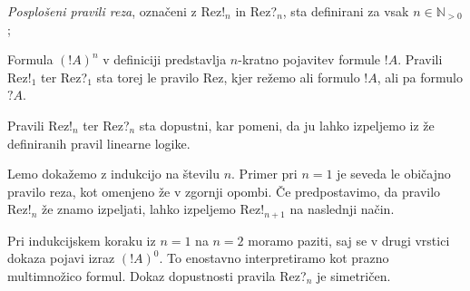 \begin{definicija}
    \emph{Posplošeni pravili reza}, označeni z Rez!$_n$ in Rez?$_{n}$, sta definirani za vsak $n\in\mathbb{N}_{>0}$;
    \begin{prooftree}
    \end{prooftree}
    \begin{prooftree}
    \end{prooftree}
\end{definicija}

\begin{opomba}
    Formula $(!A)^n$ v definiciji predstavlja $n$-kratno pojavitev formule $!A$. Pravili Rez!$_{1}$ ter Rez?$_{1}$ sta torej le pravilo Rez, kjer režemo ali formulo $!A$, ali pa formulo $?A$.
\end{opomba}

\begin{lema}
    Pravili Rez!$_n$ ter Rez?$_{n}$ sta dopustni, kar pomeni, da ju lahko izpeljemo iz že definiranih pravil linearne logike.
\end{lema}

\begin{dokaz}
    Lemo dokažemo z indukcijo na številu $n$. Primer pri $n=1$ je seveda le običajno pravilo reza, kot omenjeno že v zgornji opombi. Če predpostavimo, da pravilo Rez!$_n$ že znamo izpeljati, lahko izpeljemo Rez!$_{n+1}$ na naslednji način.
    \begin{prooftree}

    \end{prooftree}
    Pri indukcijskem koraku iz $n=1$ na $n=2$ moramo paziti, saj se v drugi vrstici dokaza pojavi izraz $(!A)^0$. To enostavno interpretiramo kot prazno multimnožico formul. Dokaz dopustnosti pravila Rez?$_{n}$ je simetričen.
\end{dokaz}

